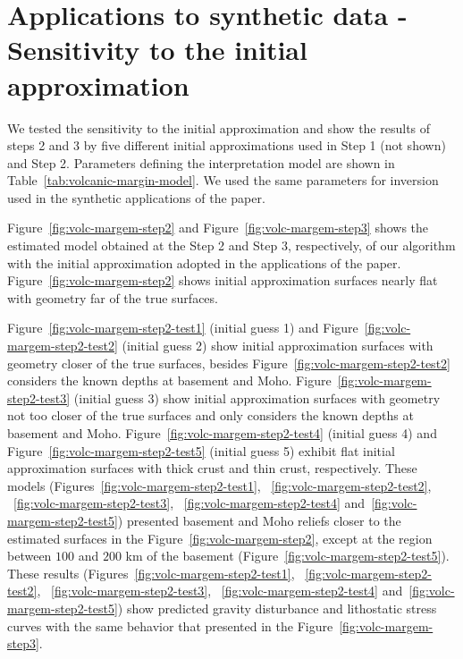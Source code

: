 \documentclass[manuscript]{geophysics}
\begin{document}
\section{Applications to synthetic data - Sensitivity to the initial approximation}

We tested the sensitivity to the initial approximation and show the results of steps 2 and 3 by five different initial approximations used in Step 1 (not shown) and Step 2. Parameters defining the interpretation model are shown in Table~\ref{tab:volcanic-margin-model}.  We used the same parameters for inversion used in the synthetic applications of the paper.

Figure~\ref{fig:volc-margem-step2} and Figure~\ref{fig:volc-margem-step3} shows the estimated model obtained at the Step 2 and Step 3, respectively, of our algorithm with the initial approximation adopted in the applications of the paper. Figure~\ref{fig:volc-margem-step2} shows initial approximation surfaces nearly flat with geometry far of the true surfaces. 

Figure~\ref{fig:volc-margem-step2-test1} (initial guess 1) and Figure~\ref{fig:volc-margem-step2-test2} (initial guess 2) show initial approximation surfaces with geometry closer of the true surfaces, besides Figure~\ref{fig:volc-margem-step2-test2} considers the known depths at basement and Moho. Figure~\ref{fig:volc-margem-step2-test3} (initial guess 3) show initial approximation surfaces with geometry not too closer of the true surfaces and only considers the known depths at basement and Moho. Figure~\ref{fig:volc-margem-step2-test4} (initial guess 4) and Figure~\ref{fig:volc-margem-step2-test5} (initial guess 5) exhibit flat initial approximation surfaces with thick crust and thin crust, respectively. These models (Figures~\ref{fig:volc-margem-step2-test1}, ~\ref{fig:volc-margem-step2-test2}, ~\ref{fig:volc-margem-step2-test3}, ~\ref{fig:volc-margem-step2-test4} and~\ref{fig:volc-margem-step2-test5}) presented basement and Moho reliefs closer to the estimated surfaces in the Figure~\ref{fig:volc-margem-step2}, except at the region between $100$ and $200$ km of the basement (Figure~\ref{fig:volc-margem-step2-test5}). These results (Figures~\ref{fig:volc-margem-step2-test1}, ~\ref{fig:volc-margem-step2-test2}, ~\ref{fig:volc-margem-step2-test3}, ~\ref{fig:volc-margem-step2-test4} and~\ref{fig:volc-margem-step2-test5}) show predicted gravity disturbance and lithostatic stress curves with the same behavior that presented in the Figure~\ref{fig:volc-margem-step3}. 
\end{document}
